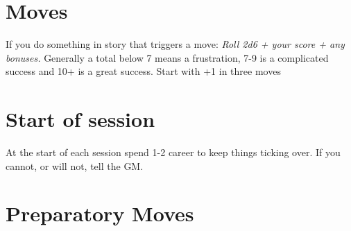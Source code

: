 \documentclass[letterpaper]{twentysecondcv} %
\begin{document}




\skillstext{}


\makeprofile %


\section{Moves}

If you do something in story that triggers a move: \emph{Roll 2d6 + your score + any bonuses.} 
Generally a total below 7 means a frustration, 7-9 is a complicated success and 10+ is a great success.
Start with +1 in three moves

\section{Start of session}
At the start of each session spend 1-2 career to keep things ticking over. If you cannot, or will not, tell the GM.

\section{Preparatory Moves}
\end{document}
